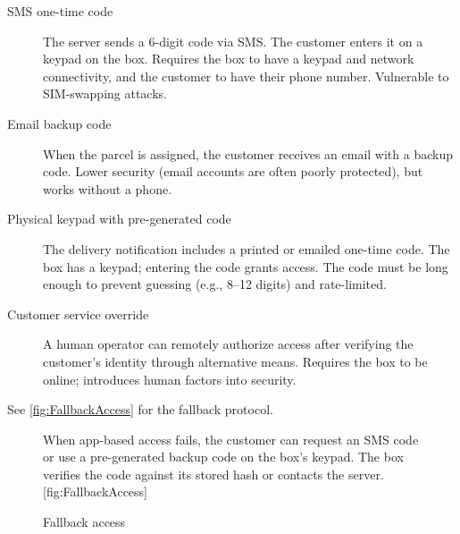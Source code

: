 \begin{description}
  \item[SMS one-time code] The server sends a 6-digit code via SMS.
    The customer enters it on a keypad on the box.
    Requires the box to have a keypad and network connectivity, and the 
    customer to have their phone number.
    Vulnerable to SIM-swapping attacks.
  \item[Email backup code] When the parcel is assigned, the customer receives 
    an email with a backup code.
    Lower security (email accounts are often poorly protected), but works 
    without a phone.
  \item[Physical keypad with pre-generated code] The delivery notification 
    includes a printed or emailed one-time code.
    The box has a keypad; entering the code grants access.
    The code must be long enough to prevent guessing (e.g., 8--12 digits) and 
    rate-limited.
  \item[Customer service override] A human operator can remotely authorize 
    access after verifying the customer's identity through alternative means.
    Requires the box to be online; introduces human factors into security.
\end{description}

See \cref{fig:FallbackAccess} for the fallback protocol.

\begin{figure}
  \begin{sidecaption}{%
    When app-based access fails, the customer can request an SMS code or use a 
    pre-generated backup code on the box's keypad.
    The box verifies the code against its stored hash or contacts the server.
  }[fig:FallbackAccess]
  \flushright
  \begin{msc}
    [/msc/action width=0.35\linewidth]
    {Fallback access}
      \nextlevel[2]
      \nextlevel[2]
      \nextlevel[2]
      \nextlevel
      \nextlevel
      \nextlevel
      \nextlevel
      \nextlevel
  \end{msc}
  \end{sidecaption}
\end{figure}


